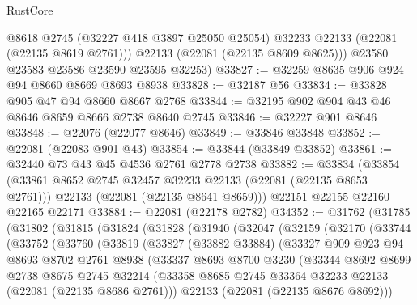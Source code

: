 \begin{lexlean}{RustCore}
\begin{coremodule}
          @8618
          @2745
          (@32227 @418 @3897 @25050 @25054)
          @32233
          @22133
          (@22081 (@22135 @8619 @2761)))
        @22133
        (@22081 (@22135 @8609 @8625)))
      @23580
      @23583
      @23586
      @23590
      @23595
      @32253)
@33827 := @32259 @8635 @906 @924 @94 @8660 @8669 @8693 @8938
@33828 := @32187 @56
@33834 := @33828 @905 @47 @94 @8660 @8667 @2768
@33844 := @32195 @902 @904 @43 @46 @8646 @8659 @8666 @2738 @8640 @2745
@33846 := @32227 @901 @8646
@33848 := @22076 (@22077 @8646)
@33849 := @33846 @33848
@33852 := @22081 (@22083 @901 @43)
@33854 := @33844 (@33849 @33852)
@33861 := @32440 @73 @43 @45 @4536 @2761 @2778 @2738
@33882 := @33834
    (@33854
      (@33861 @8652 @2745 @32457 @32233 @22133 (@22081 (@22135 @8653 @2761)))
      @22133
      (@22081 (@22135 @8641 @8659)))
    @22151
    @22155
    @22160
    @22165
    @22171
@33884 := @22081 (@22178 @2782)
@34352 := @31762
    (@31785
      (@31802
        (@31815
          (@31824
            (@31828
              (@31940
                (@32047
                  (@32159
                    (@32170
                      (@33744
                        (@33752
                          (@33760
                            (@33819
                              (@33827
                                (@33882 @33884)
                                (@33327
                                  @909
                                  @923
                                  @94
                                  @8693
                                  @8702
                                  @2761
                                  @8938
                                  (@33337
                                    @8693
                                    @8700
                                    @3230
                                    (@33344
                                      @8692
                                      @8699
                                      @2738
                                      @8675
                                      @2745
                                      @32214
                                      (@33358
                                        @8685
                                        @2745
                                        @33364
                                        @32233
                                        @22133
                                        (@22081 (@22135 @8686 @2761)))
                                      @22133
                                      (@22081 (@22135 @8676 @8692)))

\end{coremodule}
\end{lexlean}
